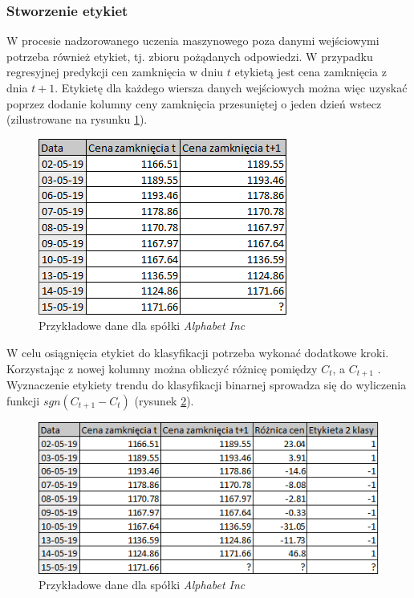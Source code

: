 \documentclass[a4paper, twoside, 11pt, openright]{article}
\begin{document}
\subsubsection{Stworzenie etykiet}

W procesie nadzorowanego uczenia maszynowego poza danymi wejściowymi potrzeba również etykiet, tj. zbioru pożądanych odpowiedzi. W przypadku regresyjnej predykcji cen zamknięcia w dniu $t$ etykietą jest cena zamknięcia z dnia $t+1$. Etykietę dla każdego wiersza danych wejściowych można więc uzyskać poprzez dodanie kolumny ceny zamknięcia przesuniętej o jeden dzień wstecz (zilustrowane na rysunku \ref{img:regression_label_creation}). 

\begin{figure}[H]
\centering 
\includegraphics[scale=0.9]{img/label_creation.png}
\caption{Przykładowe dane dla spółki \textit{Alphabet Inc}}
\label{img:regression_label_creation}
\end{figure}

W celu osiągnięcia etykiet do klasyfikacji potrzeba wykonać dodatkowe kroki. Korzystając z nowej kolumny można obliczyć różnicę pomiędzy $C_t$, a $C_{t+1}$ . Wyznaczenie etykiety trendu do klasyfikacji binarnej sprowadza się do wyliczenia funkcji $sgn(C_{t+1}-C_{t})$ (rysunek \ref{img:binary_label_creation}). 

\begin{figure}[H]
\centering 
\includegraphics[scale=0.9]{img/label_creation2.png}
\caption{Przykładowe dane dla spółki \textit{Alphabet Inc}}
\label{img:binary_label_creation}
\end{figure}
\end{document}
